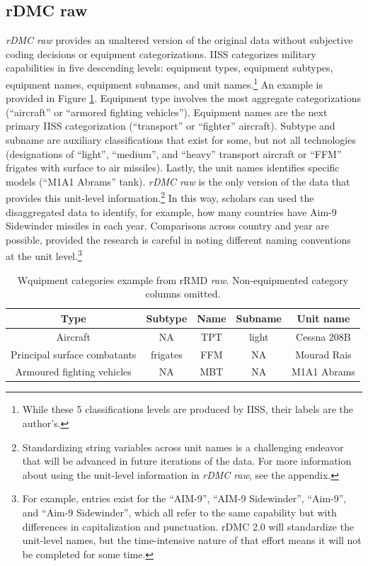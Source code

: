 \documentclass[
]{article}
\begin{document}
\hypertarget{rdmc-raw}{%
\subsection{rDMC raw}\label{rdmc-raw}}

\emph{rDMC raw} provides an unaltered version of the original data without subjective coding decisions or equipment categorizations. IISS categorizes military capabilities in five descending levels: equipment types, equipment subtypes, equipment names, equipment subnames, and unit names.\footnote{While these 5 classifications levels are produced by IISS, their labels are the author's.} An example is provided in Figure \ref{table:equipment}. Equipment type involves the most aggregate categorizations (``aircraft'' or ``armored fighting vehicles''). Equipment names are the next primary IISS categorization (``transport'' or ``fighter'' aircraft). Subtype and subname are auxiliary classifications that exist for some, but not all technologies (designations of ``light'', ``medium'', and ``heavy'' transport aircraft or ``FFM'' frigates with surface to air missiles). Lastly, the unit names identifies specific models (``M1A1 Abrams'' tank). \emph{rDMC raw} is the only version of the data that provides this unit-level information.\footnote{Standardizing string variables across unit names is a challenging endeavor that will be advanced in future iterations of the data. For more information about using the unit-level information in \emph{rDMC raw}, see the appendix.} In this way, scholars can used the disaggregated data to identify, for example, how many countries have Aim-9 Sidewinder missiles in each year. Comparisons across country and year are possible, provided the research is careful in noting different naming conventions at the unit level.\footnote{For example, entries exist for the ``AIM-9'', ``AIM-9 Sidewinder'', ``Aim-9'', and ``Aim-9 Sidewinder'', which all refer to the same capability but with differences in capitalization and punctuation. rDMC 2.0 will standardize the unit-level names, but the time-intensive nature of that effort means it will not be completed for some time.}

\begin{singlespace}   
\begin{table}[h]
\centering              
\caption[Equipment sample]{Wquipment categories example from rRMD \textit{raw}. Non-equipmented category columns omitted.}
  \begin{tabular}{|c|c|c|c|c|}
  \hline
  \textbf{Type} & \textbf{Subtype} & \textbf{Name} & \textbf{Subname} & \textbf{Unit name} \\
  \hline
  Aircraft & NA & TPT & light & Cessna 208B \\
  \hline
  Principal surface combatants & frigates & FFM & NA & Mourad Rais \\
  \hline
  Armoured fighting vehicles & NA & MBT & NA & M1A1 Abrams \\
  \hline
\end{tabular}
\label{table:equipment}
\end{table}
\end{singlespace}
\end{document}
